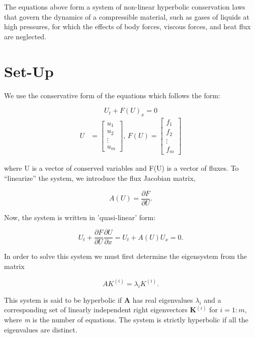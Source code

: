 \documentclass[]{article}
\begin{document}
	The equations above form a system of non-linear hyperbolic conservation laws that govern the dynamics of a compressible material, such as gases of liquids at high pressures, for which the effects of body forces, viscous forces, and heat flux are neglected. 
	
\section{Set-Up}
	We use the conservative form of the equations which follows the form:
	 
	\begin{equation}
		U_t + F(U)_x = 0
		\label{Gen_Hyp}
	\end{equation}
		\begin{align}
			U &= \begin{bmatrix}
				u_{1} \\
				u_{2} \\
				\vdots \\
				u_{m}
				\end{bmatrix} \mbox{,  } 
				F(U) = \begin{bmatrix}
				f_{1} \\
				f_{2} \\
				\vdots \\
				f_{m}
				\end{bmatrix} 
		\end{align}

	where U is a vector of conserved variables and F(U) is a vector of fluxes. To ``linearize'' the system, we introduce the flux Jacobian matrix,
	
	\begin{equation}
		A(U) = \frac{\partial F}{\partial U}.
		\label{HypSys}
	\end{equation}
	
	Now, the system is written in 'quasi-linear' form:
	
	\begin{equation}
		U_t + \frac{\partial F}{\partial U}\frac{\partial U}{\partial x} = U_t + A(U) U_x = 0.
		\label{QLHypSys}
	\end{equation}
	
	In order to solve this system we must first determine the eigensystem from the matrix
	
	\begin{equation}
		A K^{(i)} = \lambda_i K^{(i)}.
	\end{equation}
	
	This system is said to be hyperbolic if \textbf{A} has real eigenvalues $\lambda_i$ and a corresponding set of linearly independent right eigenvectors \textbf{K$^{(i)}$} for $i=1:m$, where \textit{m} is the number of equations. The system is strictly hyperbolic if all the eigenvalues are distinct.
	
\end{document}
